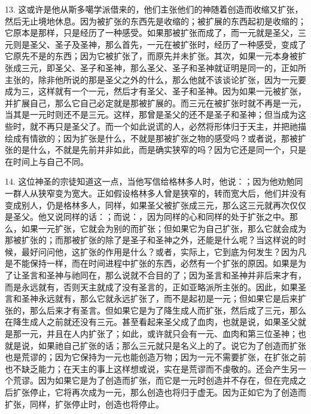 13. 这或许是他从斯多噶学派借来的，他们主张他们的神随着创造而收缩又扩张，然后无止境地休息。因为被扩张的东西先是收缩的；被扩展的东西起初是收缩的；它原本是那样，只是经历了一种感受。如果那被扩张而成了，而一元就是圣父，三元则是圣父、圣子及圣神，那么首先，一元在被扩张时，经历了一种感受，变成了它原先不是的东西；因为它被扩张了，而原先并未扩张。其次，如果一元本身被扩张成三元，即圣父、圣子和圣神，那么圣父、圣子和圣神就证明是同一的，正如所主张的，除非他所说的那是圣父之外的什么，那么他就不该谈论扩张，因为一元要成为三，这样就有一个一元，然后才有圣父、圣子和圣神。因为如果一元被扩张，并扩展自己，那么它自己必定就是那被扩展的。而三元在被扩张时就不再是一元，当其是一元时则还不是三元。这样，那曾是圣父的还不是圣子和圣神；但当成为这些时，就不再只是圣父了。而一个如此说谎的人，必然将形体归于天主，并把祂描绘成有情欲的；因为扩张是什么，不就是那被扩张之物的感受吗？或者说，那被扩张的是什么，不就是先前并非如此，而是确实狭窄的吗？因为它还是同一个，只是在时间上与自己不同。\par

14. 这位神圣的宗徒知道这一点，当他写信给格林多人时，他说：；因为他劝勉同一群人从狭窄变为宽大。正如假设格林多人曾是狭窄的，转而宽大后，他们并没有变成别人，仍是格林多人，同样，如果圣父被扩张成三元，那么这三元就再次仅仅是圣父。他又说同样的话：；而说：，因为同样的心和同样的处于扩张之中。那么，如果一元扩张，它就会为别的而扩张；但如果它为自己扩张，那么它就会成为那被扩张的；而那被扩张的除了是圣子和圣神之外，还能是什么呢？当这样说的时候，最好问问他，这扩张的作用是什么？或者，实际上，它到底为何发生？因为凡是不能保持一样，而在时间进程中扩张的东西，必然有一个扩张的原因。如果是为了让圣言和圣神与祂同在，那么说就不合目的了；因为圣言和圣神并非后来才有，而是永远就有，否则天主就成了没有圣言的，正如亚略派所主张的。因此，如果圣言和圣神永远就有，那么它就永远扩张了，而不是起初是一元；但如果它是后来扩张的，那么后来才有圣言。但如果它是为了降生成人而扩张，然后成了三元，那么在降生成人之前就还没有三元。甚至看起来圣父成了血肉，也就是说，如果圣父就是那一元，并且在人内扩张了；如此，或许就只会有一元、血肉和第三位圣神；也就是说，如果祂自己扩张的话；那么三元就只是名义上的了。说它为了创造而扩张也是荒谬的；因为它保持为一元也能创造万物；因为一元不需要扩张，在扩张之前也不缺乏能力；在天主的事上这样想或说，实在是荒谬而不虔敬的。还会产生另一个荒谬。因为如果它是为了创造而扩张，而它是一元时创造并不存在，但在完成之后扩张停止，它将再次成为一元，那么创造也将归于虚无。因为正如它为了创造而扩张，同样，扩张停止时，创造也将停止。\par

